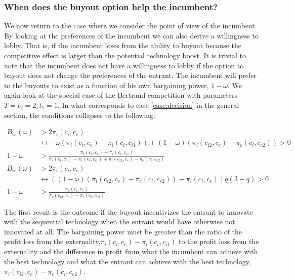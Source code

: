 \documentclass[11pt]{article}
\begin{document}
\subsubsection{When does the buyout option help the incumbent?}

We now return to the case where we consider the point of view of the incumbent. By looking at the preferences of the incumbent we can also derive a willingness to lobby. That is, if the incumbent loses from the ability to buyout because the competitive effect is larger than the potential technology boost. It is trivial to note that the incumbent does not have a willingness to lobby if the option to buyout does not change the preferences of the entrant. The incumbent will prefer to the buyouts to exist as a function of his own bargaining power, $1-\omega$. We again look at the special case of the Bertrand competition with parameters $T=t_2=2,t_1=1$. In what corresponds to case \ref{case:decision} in the general section, the conditions collapses to the following. 

\begin{align*}
B_{is}(\omega)&>2 \pi_i(c_i,c_e) \\
& \leftrightarrow -\omega(\pi_i(c_i,c_{e})- \pi_i(c_i,c_{i1})) 
+(1-\omega)(\pi_i(c_{i2},c_e)-\pi_e(c_{i},c_{e2})) >0 \\
1-\omega &> \frac{\pi_i(c_i,c_{e})- \pi_i(c_i,c_{i1})}{\pi_i(c_i,c_{e})- \pi_i(c_i,c_{i1})+\pi_i(c_{i2},c_e)-\pi_e(c_{i},c_{e2})}
\\
B_{ir}(\omega)&>2 \pi_i(c_i,c_e) \\
& \leftrightarrow ((1-\omega)(\pi_{i}(c_{i2},c_{e})-\pi_{e}(c_{i},c_{e2}))-\pi_i(c_i,c_e)) q(3-q)>0 \\
1-\omega&>\frac{\pi_i(c_i,c_e)}{\pi_i(c_{i2},c_e)-\pi_i(c_{i},c_{e2})}
\end{align*}

The first result is the outcome if the buyout incentivizes the entrant to innovate with the sequential technology when the entrant would have otherwise not innovated at all. The bargaining power must be greater than the ratio of the profit loss from the externality,$\pi_i(c_i,c_{e})- \pi_i(c_i,c_{i1})$ to the profit loss from the externality and the difference in profit from what the incumbent can achieve with the best technology and what the entrant can achieve with the best technology,$\pi_i(c_{i2},c_e)-\pi_e(c_{i},c_{e2})$. 
\end{document}
